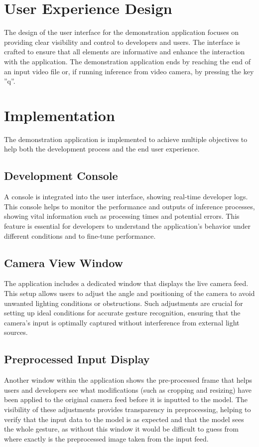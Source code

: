 \section{User Experience Design}
The design of the user interface for the demonstration application focuses on providing clear visibility and control to developers and users. The interface is crafted to ensure that all elements are informative and enhance the interaction with the application. The demonstration application ends by reaching the end of an input video file or, if running inference from video camera, by pressing the key ''q''.

\section{Implementation}
The demonstration application is implemented to achieve multiple objectives to help both the development process and the end user experience.

\subsection{Development Console}
A console is integrated into the user interface, showing real-time developer logs. This console helps to monitor the performance and outputs of inference processes, showing vital information such as processing times and potential errors. This feature is essential for developers to understand the application's behavior under different conditions and to fine-tune performance.

\subsection{Camera View Window}
The application includes a dedicated window that displays the live camera feed. This setup allows users to adjust the angle and positioning of the camera to avoid unwanted lighting conditions or obstructions. Such adjustments are crucial for setting up ideal conditions for accurate gesture recognition, ensuring that the camera's input is optimally captured without interference from external light sources.

\subsection{Preprocessed Input Display}
Another window within the application shows the pre-processed frame that helps users and developers see what modifications (such as cropping and resizing) have been applied to the original camera feed before it is inputted to the model. The visibility of these adjustments provides transparency in preprocessing, helping to verify that the input data to the model is as expected and that the model sees the whole gesture, as without this window it would be difficult to guess from where exactly is the preprocessed image taken from the input feed.

